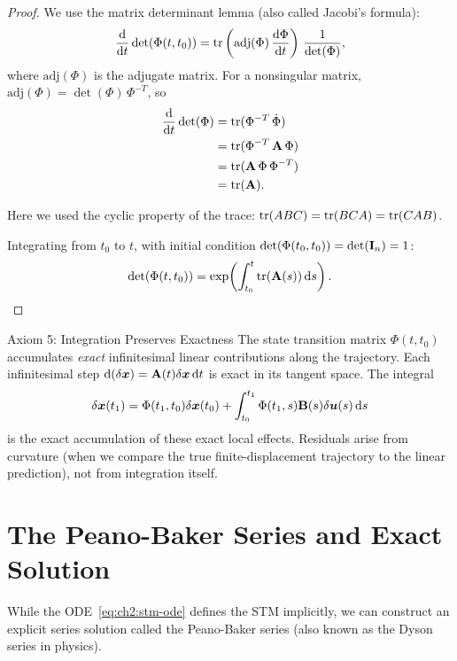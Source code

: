 \begin{proof}
We use the matrix determinant lemma (also called Jacobi's formula):
\begin{equation}
\frac{\mathrm{d}}{\mathrm{d} t}\det(\Phi(t,t_0)) = \operatorname{tr}\left(\text{adj}(\Phi)\,\frac{\mathrm{d}\Phi}{\mathrm{d} t}\right)\,\frac{1}{\det(\Phi)},
\label{eq:ch2:jacobi}
\end{equation}
where $\text{adj}(\Phi)$ is the adjugate matrix. For a nonsingular matrix,
$\text{adj}(\Phi) = \det(\Phi)\,\Phi^{-T}$, so
\begin{align}
\frac{\mathrm{d}}{\mathrm{d} t}\det(\Phi) &= \operatorname{tr}(\Phi^{-T}\,\dot{\Phi})\\
&= \operatorname{tr}(\Phi^{-T}\,\mathbf{A}\,\Phi)\\
&= \operatorname{tr}(\mathbf{A}\,\Phi\,\Phi^{-T})\\
&= \operatorname{tr}(\mathbf{A}).
\end{align}

Here we used the cyclic property of the trace: $\operatorname{tr}(ABC) = \operatorname{tr}(BCA) = \operatorname{tr}(CAB)$.

Integrating from $t_0$ to $t$, with initial condition $\det(\Phi(t_0,t_0)) = \det(\mathbf{I}_n) = 1$:
\begin{equation}
\det(\Phi(t,t_0)) = \exp\!\left(\int_{t_0}^{t}\operatorname{tr}(\mathbf{A}(s))\,\mathrm{d} s\right).
\end{equation}
\end{proof}

\begin{axiombox}{Axiom 5: Integration Preserves Exactness}
The state transition matrix $\Phi(t,t_0)$ accumulates \emph{exact} infinitesimal linear
contributions along the trajectory. Each infinitesimal step $\mathrm{d}(\delta\bm{x})=\mathbf{A}(t)\delta\bm{x}\,\mathrm{d} t$
is exact in its tangent space. The integral
\[
\delta\bm{x}(t_1) = \Phi(t_1,t_0)\delta\bm{x}(t_0)
+ \int_{t_0}^{t_1}\Phi(t_1,s)\mathbf{B}(s)\delta\bm{u}(s)\,\mathrm{d} s
\]
is the exact accumulation of these exact local effects. Residuals arise from curvature
(when we compare the true finite-displacement trajectory to the linear prediction), not
from integration itself.
\end{axiombox}


\section{The Peano-Baker Series and Exact Solution}

While the ODE~\eqref{eq:ch2:stm-ode} defines the STM implicitly, we can construct an explicit
series solution called the Peano-Baker series (also known as the Dyson series in physics).

